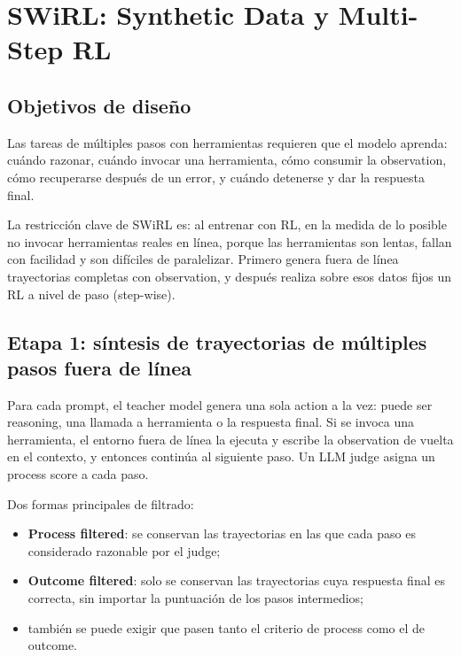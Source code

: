 \section{SWiRL: Synthetic Data y Multi-Step RL}

\subsection{Objetivos de diseño}

Las tareas de múltiples pasos con herramientas requieren que el modelo aprenda: cuándo razonar, cuándo invocar una herramienta, cómo consumir la observation, cómo recuperarse después de un error, y cuándo detenerse y dar la respuesta final.



La restricción clave de SWiRL es: al entrenar con RL, en la medida de lo posible no invocar herramientas reales en línea, porque las herramientas son lentas, fallan con facilidad y son difíciles de paralelizar. Primero genera fuera de línea trayectorias completas con observation, y después realiza sobre esos datos fijos un RL a nivel de paso (step-wise).

\subsection{Etapa 1: síntesis de trayectorias de múltiples pasos fuera de línea}

Para cada prompt, el teacher model genera una sola action a la vez: puede ser reasoning, una llamada a herramienta o la respuesta final. Si se invoca una herramienta, el entorno fuera de línea la ejecuta y escribe la observation de vuelta en el contexto, y entonces continúa al siguiente paso. Un LLM judge asigna un process score a cada paso.


Dos formas principales de filtrado:

\begin{itemize}
    \item \textbf{Process filtered}: se conservan las trayectorias en las que cada paso es considerado razonable por el judge;
    \item \textbf{Outcome filtered}: solo se conservan las trayectorias cuya respuesta final es correcta, sin importar la puntuación de los pasos intermedios;
    \item también se puede exigir que pasen tanto el criterio de process como el de outcome.
\end{itemize}

